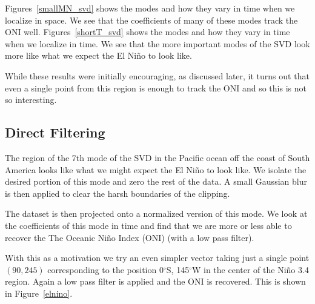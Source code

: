 \documentclass[10pt]{article}
\begin{document}
Figures~\ref{smallMN_svd} shows the modes and how they vary in time when we localize in space. We see that the coefficients of many of these modes track the ONI well.
Figures~\ref{shortT_svd} shows the modes and how they vary in time when we localize in time. We see that the more important modes of the SVD look more like what we expect the El Ni\~no to look like.

While these results were initially encouraging, as discussed later, it turns out that even a single point from this region is enough to track the ONI and so this is not so interesting.







\subsection{Direct Filtering}
The region of the 7th mode of the SVD in the Pacific ocean off the coast of South America looks like what we might expect the El Ni\~no to look like. We isolate the desired portion of this mode and zero the rest of the data. A small Gaussian blur is then applied to clear the harsh boundaries of the clipping.

The dataset is then projected onto a normalized version of this mode. We look at the coefficients of this mode in time and find that we are more or less able to recover the The Oceanic Ni\~no Index (ONI) (with a low pass filter).

With this as a motivation we try an even simpler vector taking just a single point \( (90,245) \) corresponding to the position 0\(^\circ\)S, 145\(^\circ\)W in the center of the Ni\~no 3.4 region. Again a low pass filter is applied and the ONI is recovered. This is shown in Figure~\ref{elnino}.
\end{document}
